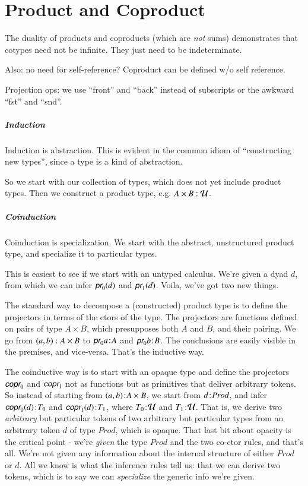 \chapter{Product and Coproduct}

The duality of products and coproducts (which are \textit{not} sums)
demonstrates that cotypes need not be infinite. They just need to be
indeterminate.

Also: no need for self-reference? Coproduct can be defined w/o self
reference.

Projection ops: we use ``front'' and ``back'' instead of subscripts or
the awkward ``fst'' and ``snd''.

\paragraph{Induction}

Induction is abstraction. This is evident in the common idiom of
``constructing new types'', since a type is a kind of abstraction.

So we start with our collection of types, which does not yet include
product types. Then we construct a product type, e.g.
\(A\times{}B:\mathcal{U}\).

\paragraph{Coinduction}

Coinduction is specialization. We start with the abstract,
unstructured product type, and specialize it to particular types.

This is easiest to see if we start with an untyped calculus. We're
given a dyad \(d\), from which we can infer \(\textsf{\slshape
  pr}_0(d)\) and \(\textsf{\slshape pr}_1(d)\). Voila, we've got two
new things.

The standard way to decompose a (constructed) product type is to
define the projectors in terms of the ctors of the type. The
projectors are functions defined on pairs of type \(A\times{}B\),
which presupposes both \(A\) and \(B\), and their pairing. We go from
\((a,b):A\times{}B\) to \(\tj{\lproj{a}}{A}\) and
\(\tj{\lproj{b}}{B}\). The conclusions are easily visible in the
premises, and vice-versa. That's the inductive way.

The coinductive way is to start with an opaque type and define the
projectors \(\lcoproj\) and \(\rcoproj\) not as functions but as
primitives that deliver arbitrary tokens. So instead of starting from
\((a,b)\hspace{1pt}\mathpunct{:}\hspace{-1pt}A\times{}B\), we start from \(d\hspace{1pt}\mathpunct{:}\hspace{-1pt}Prod\), and
infer \(\tj{\lcoproj(d)}{T_0}\) and \(\tj{\rcoproj(d)}{T_1}\), where
\(T_0\hspace{1pt}\mathpunct{:}\hspace{-1pt}\mathcal{U}\) and \(T_1\hspace{1pt}\mathpunct{:}\hspace{-1pt}\mathcal{U}\). That is, we derive two
\textit{arbitrary} but particular tokens of two arbitrary but
particular types from an arbitrary token \(d\) of type \(Prod\), which
is opaque. That last bit about opacity is the critical point - we're
\textit{given} the type \(Prod\) and the two co-ctor rules, and that's
all. We're not given any information about the internal structure of
either \(Prod\) or \(d\). All we know is what the inference rules tell
us: that we can derive two tokens, which is to say we can
\textit{specialize} the generic info we're given.

